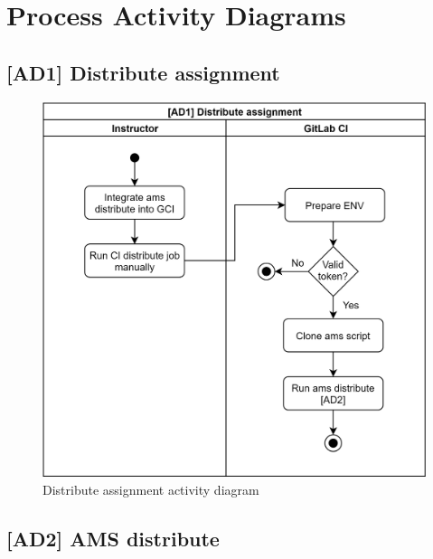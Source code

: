 \section{Process Activity Diagrams} \label{sec:ad}

\subsection{{[}AD1{]} Distribute assignment} \label{ssec: ad1}

\begin{figure}[H]
    \centering
    \includegraphics[width=\textwidth,height=\textheight,keepaspectratio]{Figures/ad/ad4.png}
    \caption{Distribute assignment activity diagram}
\end{figure}

\subsection{{[}AD2{]} AMS distribute} \label{ssec:ad2}

